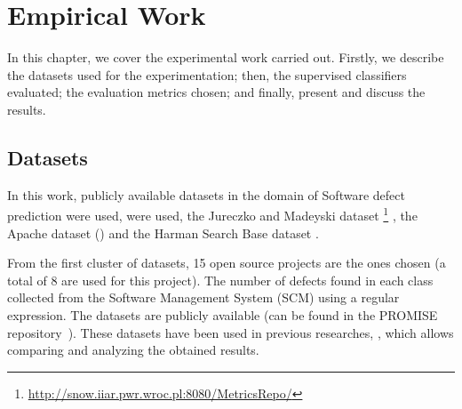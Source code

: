%
%
%
% 
%
%
%
%

\chapter{Empirical Work}\label{chp:empwork}

In this chapter, we cover the experimental work carried out. Firstly, we 
describe the datasets used for the experimentation; then, the supervised 
classifiers evaluated; the evaluation metrics chosen; and finally, present and 
discuss the results.

\section{Datasets}\label{sec:datasets}

In this work, publicly available datasets in the domain of Software defect 
prediction were used, were used, the Jureczko and Madeyski dataset
\footnote{\url{http://snow.iiar.pwr.wroc.pl:8080/MetricsRepo/}} 
\cite{Jureczko2010, MadeyskiJ2015}, the Apache dataset 
(\cite{Zimmermann07Eclipse}) and the Harman Search Base dataset 
\cite{Harman2014ssbse}. 

From the first cluster of datasets, 15 open source projects are the ones chosen 
(a total of 8 are used for this project). The number of defects found in each 
class collected from the Software Management System (SCM) using a regular 
expression. The datasets are publicly available  (can be found in the PROMISE 
repository~\cite{promiserepo}). These datasets have been used in previous 
researches, \cite{Xu2018, Wang2016, Xia2016}, which allows comparing and 
analyzing the obtained results.

